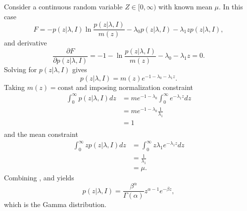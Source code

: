 \begin{example}
	Consider a continuous random variable $Z \in [0,\infty)$ with known mean $\mu$. In this case
	\begin{equation}
		F = - p(z|\lambda,I) \ln \frac{p(z|\lambda,I)}{m(z)} - \lambda_0 p(z|\lambda,I) - \lambda_1 z p(z|\lambda,I),
	\end{equation}
	and derivative
	\begin{equation}
		\frac{\partial F}{\partial p(z|\lambda,I)} = -1 - \ln\frac{p(z|\lambda,I)}{m(z)} - \lambda_0 - \lambda_1 z = 0.
	\end{equation}
	Solving for $p(z|\lambda,I)$ gives
	\begin{equation}
		p(z|\lambda,I) = m(z) e^{-1-\lambda_0 - \lambda_1 z}.
		\label{eq:n13}
	\end{equation}
	Taking $m(z) = \text{const}$ and imposing normalization constraint
	\begin{equation}
		\begin{split}
			\int_0^\infty p(z|\lambda,I) dz &= m e^{-1-\lambda_0}\int_0^\infty e^{- \lambda_1 z} dz\\
			& = m e^{-1-\lambda_0} \frac{1}{\lambda_1}\\
			&= 1\\
		\end{split}
		\label{eq:na1}
	\end{equation}
	and the mean constraint
	\begin{equation}
		\begin{split}
			\int_0^\infty z p(z|\lambda,I) dz &= \int_0^\infty z \lambda_1 e^{-\lambda_1 z} dz\\
			& = \frac{1}{\lambda_1}\\
			&= \mu.
		\end{split}
		\label{eq:na2}
	\end{equation}
	Combining ,  and  yields
	\begin{equation}
		p(z|\lambda,I) = \frac{\beta^\alpha}{\Gamma(\alpha)} z^{\alpha-1} e^{-\beta z},
	\end{equation}
	which is the Gamma distribution.
\end{example}



